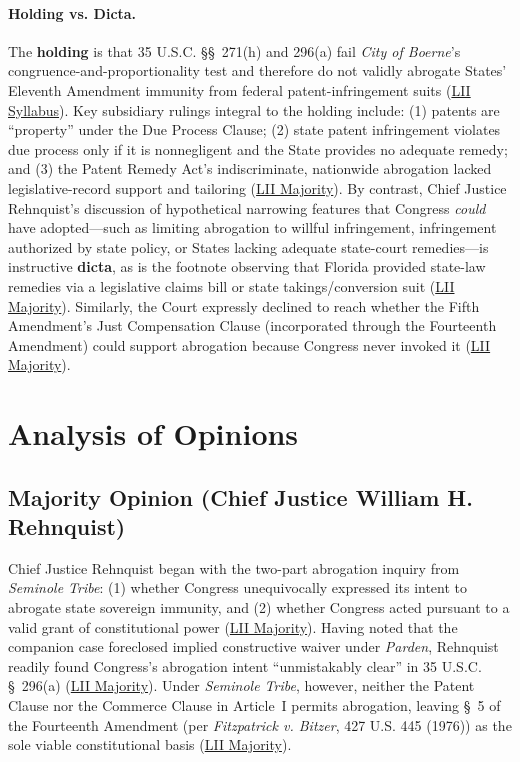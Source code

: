 \documentclass[12pt]{article}
\begin{document}
\paragraph{Holding vs. Dicta.}
The \textbf{holding} is that 35 U.S.C. \S\S~271(h) and 296(a) fail \textit{City of Boerne}'s congruence-and-proportionality test and therefore do not validly abrogate States' Eleventh Amendment immunity from federal patent-infringement suits (\href{https://www.law.cornell.edu/supct/html/98-531.ZS.html}{LII Syllabus}). Key subsidiary rulings integral to the holding include: (1) patents are ``property'' under the Due Process Clause; (2) state patent infringement violates due process only if it is nonnegligent and the State provides no adequate remedy; and (3) the Patent Remedy Act's indiscriminate, nationwide abrogation lacked legislative-record support and tailoring (\href{https://www.law.cornell.edu/supct/html/98-531.ZO.html}{LII Majority}). By contrast, Chief Justice Rehnquist's discussion of hypothetical narrowing features that Congress \textit{could} have adopted---such as limiting abrogation to willful infringement, infringement authorized by state policy, or States lacking adequate state-court remedies---is instructive \textbf{dicta}, as is the footnote observing that Florida provided state-law remedies via a legislative claims bill or state takings/conversion suit (\href{https://www.law.cornell.edu/supct/html/98-531.ZO.html}{LII Majority}). Similarly, the Court expressly declined to reach whether the Fifth Amendment's Just Compensation Clause (incorporated through the Fourteenth Amendment) could support abrogation because Congress never invoked it (\href{https://www.law.cornell.edu/supct/html/98-531.ZO.html}{LII Majority}).

\section{Analysis of Opinions}

\subsection{Majority Opinion (Chief Justice William H. Rehnquist)}

Chief Justice Rehnquist began with the two-part abrogation inquiry from \textit{Seminole Tribe}: (1) whether Congress unequivocally expressed its intent to abrogate state sovereign immunity, and (2) whether Congress acted pursuant to a valid grant of constitutional power (\href{https://www.law.cornell.edu/supct/html/98-531.ZO.html}{LII Majority}). Having noted that the companion case foreclosed implied constructive waiver under \textit{Parden}, Rehnquist readily found Congress's abrogation intent ``unmistakably clear'' in 35 U.S.C. \S~296(a) (\href{https://www.law.cornell.edu/supct/html/98-531.ZO.html}{LII Majority}). Under \textit{Seminole Tribe}, however, neither the Patent Clause nor the Commerce Clause in Article~I permits abrogation, leaving \S~5 of the Fourteenth Amendment (per \textit{Fitzpatrick v. Bitzer}, 427 U.S. 445 (1976)) as the sole viable constitutional basis (\href{https://www.law.cornell.edu/supct/html/98-531.ZO.html}{LII Majority}).
\end{document}
